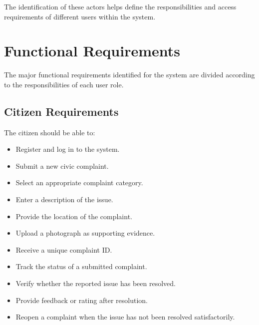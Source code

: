 \documentclass[12pt,a4paper]{article}
\begin{document}
The identification of these actors helps define the responsibilities and access requirements of different users within the system.


\section{Functional Requirements}

The major functional requirements identified for the system are divided according to the responsibilities of each user role.

\subsection{Citizen Requirements}

The citizen should be able to:

\begin{itemize}[leftmargin=*]

\item Register and log in to the system.

\item Submit a new civic complaint.

\item Select an appropriate complaint category.

\item Enter a description of the issue.

\item Provide the location of the complaint.

\item Upload a photograph as supporting evidence.

\item Receive a unique complaint ID.

\item Track the status of a submitted complaint.

\item Verify whether the reported issue has been resolved.

\item Provide feedback or rating after resolution.

\item Reopen a complaint when the issue has not been resolved satisfactorily.

\end{itemize}
\end{document}
